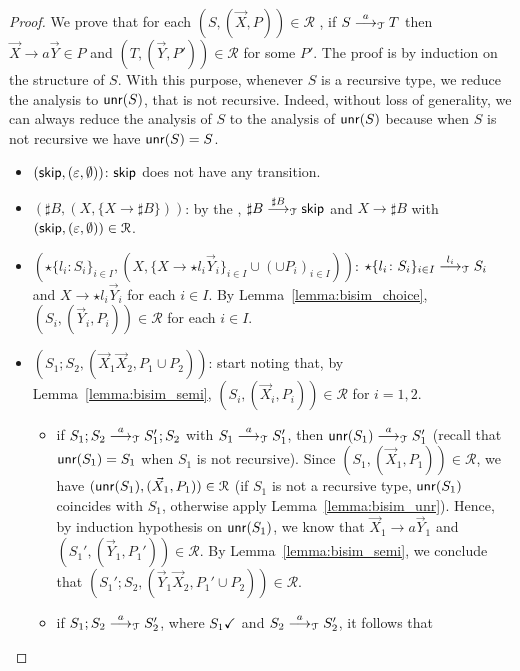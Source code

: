 \begin{proof}
	We prove that for each $(S, (\vec X, P))\in \mathcal{R}$	, if
	$S \LTSderives[a] T$ then $\vec X \rightarrow a \vec Y\in P$
	and $(T, (\vec Y, P'))\in \mathcal{R}$ for some $P'$. The proof is by
	induction on the structure of $S$. With this purpose, whenever $S$ is a 
	recursive type, we reduce the analysis to $\Unravel(S)$, that
	is not recursive. Indeed, without loss of generality, 
	we can always reduce the analysis of $S$
	to the analysis of $\Unravel(S)$
	because when $S$ is not recursive we have
	$\Unravel(S)=S$.
	\begin{itemize}
		\item $(\skipk, (\varepsilon, \emptyset))$: $\skipk$ does not have any
		transition.
		\item $(\sharp B,(X,\{X \rightarrow \sharp B\}))$: by the \LTS,
		$\sharp B\LTSderives[\sharp B] \skipk$ and $X\rightarrow \sharp B$ with
		$(\skipk, (\varepsilon, \emptyset))\in \mathcal{R}$.
		\item $(\star\{l_i\colon S_i\}_{i\in I}, (X, \{X \rightarrow \star l_i
    	\vec Y_i\}_{i\in I} \cup (\cup  P_i)_{i\in I}))$: 
    	$\star\{l_i\colon S_i\}_{i\in I}\LTSderives[l_i] S_i$ and 
    	$X \rightarrow \star l_i \vec Y_i$ for each $i\in I$. By 
    	Lemma~\ref{lemma:bisim_choice}, $(S_i, (\vec Y_i,  P_i))\in\mathcal{R}$
    	for each $i\in I$. 
    	\item $(S_1;S_2, (\vec X_1\vec X_2,  P_1 \cup  P_2))$: start noting
    	that, by Lemma~\ref{lemma:bisim_semi}, 
    	$(S_i, (\vec X_i, P_i))\in \mathcal{R}$ for $i=1,2$. 
    	\begin{itemize}
    	\item if 
    	$S_1;S_2\LTSderives[a] S_1'; S_2$ with $S_1\LTSderives[a] S_1'$, then 
    	$\Unravel(S_1)\LTSderives[a] S_1'$ (recall that $\Unravel(S_1)=S_1$ when
    	$S_1$ is not recursive). 
    	Since $(S_1,(\vec X_1, P_1))\in\mathcal{R}$, we have
    	$(\Unravel(S_1), (\vec X_1, P_1))\in \mathcal{R}$ 
    	(if $S_1$ is not a recursive type, $\Unravel(S_1)$ 
    	coincides with $S_1$, otherwise apply Lemma~\ref{lemma:bisim_unr}).
    	Hence, by induction hypothesis on $\Unravel(S_1)$, we know that 
    	$\vec X_1 \rightarrow a \vec Y_1$ and 
    	$(S_1', (\vec Y_1,P_1'))\in \mathcal{R}$. 
    	By Lemma~\ref{lemma:bisim_semi}, we conclude that 
    	$(S_1';S_2, (\vec Y_1 \vec X_2,P_1'\cup P_2))\in \mathcal{R}$. 
    	\item if $S_1;S_2\LTSderives[a] S_2'$, where $\DONE{S_1}$ and 
    	$S_2\LTSderives[a] S_2'$, it follows that 

\end{itemize}
\end{itemize}
\end{proof}
